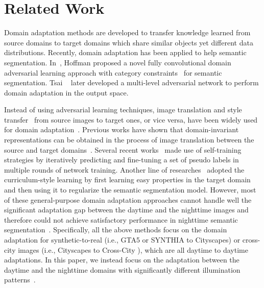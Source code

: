 \documentclass[final]{cvpr}
\begin{document}
\section{Related Work}

\hspace{0.2cm}
Domain adaptation methods are developed to transfer knowledge learned from source domains to target domains which share similar objects yet different data distributions. 
Recently, domain adaptation has been applied to help semantic segmentation. 
In~\cite{hoffman2016fcns}, Hoffman \etal proposed a novel fully convolutional domain adversarial learning approach with category constraints~\cite{pathak2015constrained} for semantic segmentation. 
Tsai \etal~\cite{tsai2018learning} later developed a multi-level adversarial network to perform domain adaptation in the output space.  

Instead of using adversarial learning techniques, image translation and style transfer~\cite{zhu2017unpaired} from source images to target ones, or vice versa, have been widely used for domain adaptation~\cite{hoffman2018cycada,wu2018dcan}. 
Previous works have shown that domain-invariant representations can be obtained in the process of image translation between the source and target domains~\cite{sankaranarayanan2018learning,zhu2018penalizing,chang2019all}. 
Several recent works~\cite{li2019bidirectional,wang2020differential,kim2020learning} made use of self-training strategies by iteratively predicting and fine-tuning a set of pseudo labels in multiple rounds of network training.
Another line of researches~\cite{zhang2017curriculum,lian2019constructing} adopted the curriculum-style learning by first learning easy properties in the target domain and then using it to regularize the semantic segmentation model.
However, most of these general-purpose domain adaptation approaches cannot handle well the significant adaptation gap between the daytime and the nighttime images and therefore could not achieve satisfactory performance in nighttime semantic segmentation~\cite{sakaridis2019guided}.
Specifically, all the above methods focus on the domain adaptation for synthetic-to-real (i.e., GTA5 \cite{richter2016playing} or SYNTHIA \cite{ros2016synthia} to Cityscapes) or cross-city images (i.e., Cityscapes to Cross-City \cite{chen2017no}), which are all daytime to daytime adaptations.
In this paper, we instead focus on the adaptation between the daytime and the nighttime domains with significantly different illumination patterns~\cite{sakaridis2019guided}.
 
\end{document}
